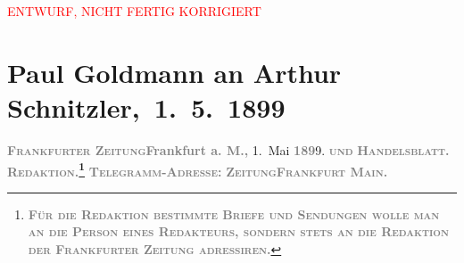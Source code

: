 
\begin{center}
            \textcolor{red}{ENTWURF, NICHT FERTIG KORRIGIERT}
                      \end{center}
            
         
         \newcommand{\erwaehntePersonen}{Personen: Marie Reinhard}
         \newcommand{\erwaehnteInstitutionen}{Institutionen: Frankfurter Zeitung}
         \newcommand{\erwaehnteOrte}{Orte: Berlin, Den Haag, Deutsches Theater Berlin, Frankfurt am Main, Graz, Wien}
         \newcommand{\erwaehnteWerke}{Werke: Der grüne Kakadu – Paracelsus – Die Gefährtin. Drei Einakter, Der grüne Kakadu. Groteske in einem Akt}
               \section[ Paul Goldmann an Arthur Schnitzler, 1. 5. 1899]{ Paul Goldmann an Arthur Schnitzler, 1. 5. 1899}\nopagebreak{}\rehead{ }\begin{ledgroupsized}[t]{13cm}\normalsize\beginnumbering \toendnotes[C]{\smallbreak\pagebreak[2]} 
\toendnotes[C]{\smallbreak}\pstart
           \noindent{}{\pb}\textcolor{gray}{\textbf{\textsc{Frankfurter Zeitung}}}\hfill \textcolor{gray}{\textbf{Frankfurt a. M.,}}{ }1. Mai \textcolor{gray}{\textbf{189}}9.\pend
           \pstart
           \textsc{\textcolor{gray}{\textbf{und}}}\pend
           \pstart
           \textcolor{gray}{\textbf{\textsc{Handelsblatt.}}}\pend
           \pstart
           \textcolor{gray}{\textbf{\textsc{Redaktion.\footnote{\noindent{}\textcolor{gray}{\textbf{\textsc{Für die Redaktion beſtimmte Briefe und Sendungen
                                    wolle man  an die Perſon eines
                                    Redakteurs, ſondern ſtets \textbf{an die Redaktion der
                                          Frankfurter Zeitung} adreſſiren.}}}}}}}\pend
           \pstart
           \textcolor{gray}{\textbf{\textsc{Telegramm-Adreſſe:}}}\pend
           \pstart
           \textcolor{gray}{\textbf{\textsc{ZeitungFrankfurt Main.}}}\pend

\end{ledgroupsized}
